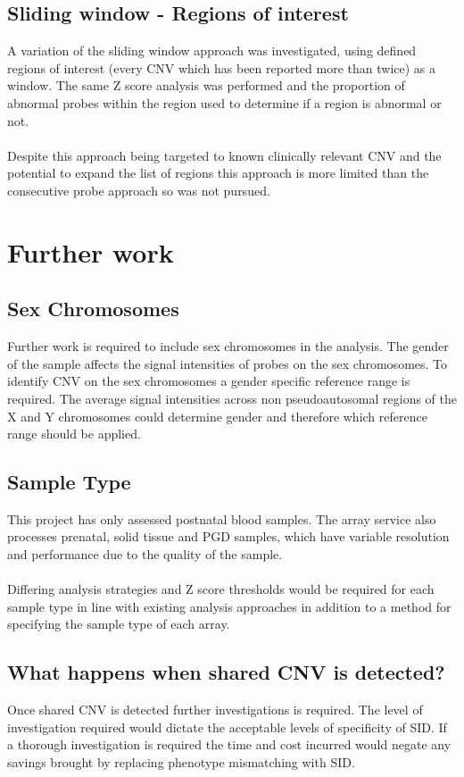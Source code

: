 \subsection{Sliding window - Regions of interest}
A variation of the sliding window approach was investigated, using defined regions of interest (every CNV which has been reported more than twice) as a window. The same Z score analysis was performed and the proportion of abnormal probes within the region used to determine if a region is abnormal or not.
\paragraph*{}
Despite this approach being targeted to known clinically relevant CNV and the potential to expand the list of regions this approach is more limited than the consecutive probe approach so was not pursued.

\section{Further work}
\subsection{Sex Chromosomes}
Further work is required to include sex chromosomes in the analysis. The gender of the sample affects the signal intensities of probes on the sex chromosomes. To identify CNV on the sex chromosomes a gender specific reference range is required. The average signal intensities across non pseudoautosomal regions of the X and Y chromosomes could determine gender and therefore which reference range should be applied.
\subsection{Sample Type}
This project has only assessed postnatal blood samples. The array service also processes prenatal, solid tissue and \ac{PGD} samples, which have variable resolution and performance due to the quality of the sample. 
\paragraph*{}
Differing analysis strategies and Z score thresholds would be required for each sample type in line with existing analysis approaches in addition to a method for specifying the sample type of each array.
\subsection{What happens when shared CNV is detected?}
Once shared CNV is detected further investigations is required. The level of investigation required would dictate the acceptable levels of specificity of SID. If a thorough investigation is required the time and cost incurred would negate any savings brought by replacing phenotype mismatching with SID.
